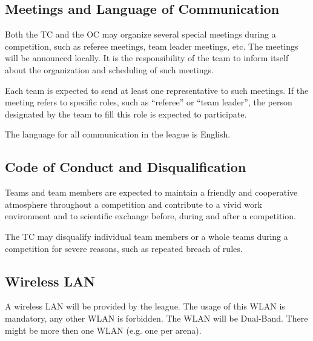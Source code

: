 \subsection{Meetings and Language of Communication}
Both the TC and the OC may organize several special meetings during a competition, such as referee meetings, team leader meetings, etc. The meetings will be announced locally. It is the responsibility of the team to inform itself about the organization and scheduling of such meetings.
\par
Each team is expected to send at least one representative to such meetings. If the meeting refers to specific roles, such as “referee” or “team leader”, the person designated by the team to fill this role is expected to participate.
\par
The language for all communication in the league is English.

\subsection{Code of Conduct and Disqualification}
Teams and team members are expected to maintain a friendly and cooperative atmosphere throughout a competition and contribute to a vivid work environment and to scientific exchange before, during and after a competition.
\par
The TC may disqualify individual team members or a whole teams during a competition for severe reasons, such as repeated breach of rules. 

\subsection{Wireless LAN}
A wireless LAN will be provided by the league. The usage of this WLAN is mandatory, any other WLAN is forbidden. The WLAN will be Dual-Band. There might be more then one WLAN (e.g. one per arena). 

